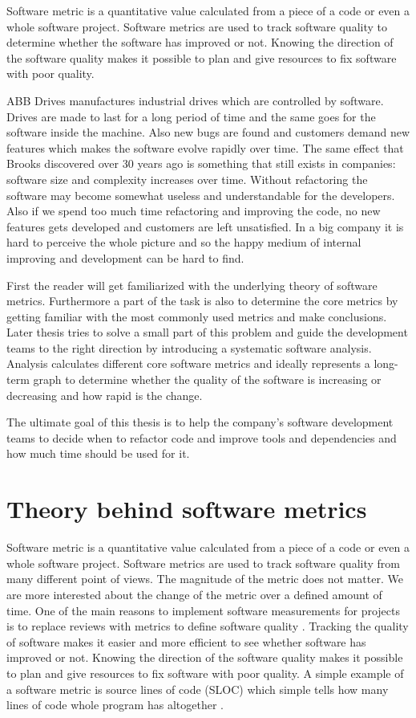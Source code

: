 Software metric is a quantitative value calculated from a piece of a code or even a whole software project. Software metrics are used to track software quality to determine whether the software has improved or not.  Knowing the direction of the software quality makes it possible to plan and give resources to fix software with poor quality.

ABB Drives manufactures industrial drives which are controlled by software. Drives are made to last for a long period of time and the same goes for the software inside the machine. Also new bugs are found and customers demand new features which makes the software evolve rapidly over time. The same effect that Brooks discovered over 30 years ago is something that still exists in companies: software size and complexity increases over time. Without refactoring the software may become somewhat useless and understandable for the developers. Also if we spend too much time refactoring and improving the code, no new features gets developed and customers are left unsatisfied. In a big company it is hard to perceive the whole picture and so the happy medium of internal improving and development can be hard to find.

First the reader will get familiarized with the underlying theory of software metrics. Furthermore a part of the task is also to determine the core metrics by getting familiar with the most commonly used metrics and make conclusions. Later thesis tries to solve a small part of this problem and guide the development teams to the right direction by introducing a systematic software analysis. Analysis calculates different core software metrics and ideally represents a long-term graph to determine whether the quality of the software is increasing or decreasing and how rapid is the change.

The ultimate goal of this thesis is to help the company’s software development teams to decide when to refactor code and improve tools and dependencies and how much time should be used for it.

\chapter{Theory behind software metrics}

Software metric is a quantitative value calculated from a piece of a code or even a whole software project. Software metrics are used to track software quality from many different point of views. The magnitude of the metric does not matter. We are more interested about the change of the metric over a defined amount of time. One of the main reasons to implement software measurements for projects is to replace reviews with metrics to define software quality \cite{sommerville2011software}. Tracking the quality of software makes it easier and more efficient to see whether software has improved or not. Knowing the direction of the software quality makes it possible to plan and give resources to fix software with poor quality. A simple example of a software metric is source lines of code (SLOC) which simple tells how many lines of code whole program has altogether \cite{nguyen2007sloc}.

